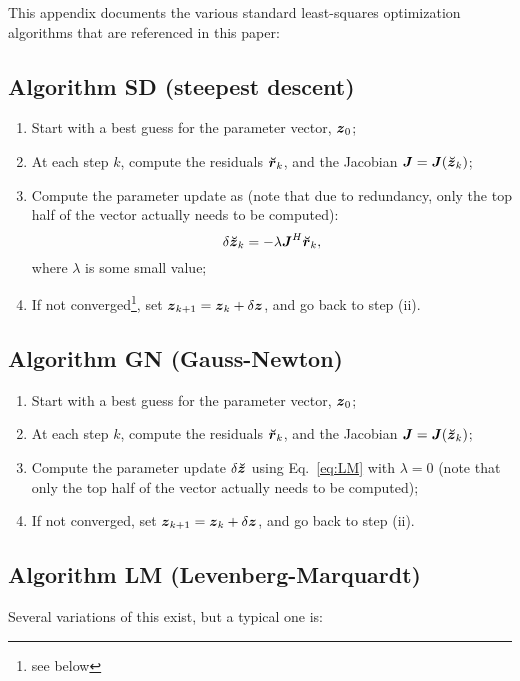 \documentclass[useAMS,usenatbib]{mn2e}
\newcommand{\zz}{\bmath{z}}
\newcommand{\mat}[1]{{\bmath{#1}}}
\newcommand{\JJ}{\mat{J}} %
\newcommand{\AUG}[1]{\bmath{\breve{#1}}}
\newcommand{\Zz}{\AUG{z}}
\newcommand{\Rr}{\AUG{r}}
\begin{document}
This appendix documents the various standard least-squares optimization algorithms 
that are referenced in this paper:

\subsection{Algorithm SD (steepest descent)}

\begin{enumerate}
\item Start with a best guess for the parameter vector, $\bmath{z}_0$;
\item At each step $k$, compute the residuals $\Rr_k$, and the Jacobian
$\JJ=\JJ(\Zz_k)$;
\item Compute the parameter update as (note that due to redundancy, only the top half of the vector actually needs
to be computed):
\[
\delta\Zz_k = - \lambda \JJ^H \Rr_k,
\]
where $\lambda$ is some small value;
\item If not converged\footnote{see below}, set $\bmath{z}_{k+1}=\bmath{z}_k+\delta\zz$, and go back to step (ii).
\end{enumerate}

\subsection{Algorithm GN (Gauss-Newton)}

\begin{enumerate}
\item Start with a best guess for the parameter vector, $\bmath{z}_0$;
\item At each step $k$, compute the residuals $\Rr_k$, and the Jacobian
$\JJ=\JJ(\Zz_k)$;
\item Compute the parameter update $\delta\Zz$ using Eq.~\ref{eq:LM} with $\lambda=0$ (note that only the top half of the vector actually needs to be computed);
\item If not converged, set $\bmath{z}_{k+1}=\bmath{z}_k+\delta\zz$, and go back to step (ii).
\end{enumerate}

\subsection{Algorithm LM (Levenberg-Marquardt)}

Several variations of this exist, but a typical one is:
\end{document}
